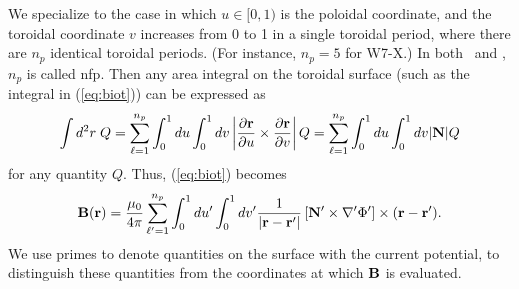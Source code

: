 We specialize to the case in which $u \in [0,1)$ is the poloidal coordinate, and the toroidal coordinate
$v$ increases from 0 to 1 in a single toroidal period, where there are $n_p$ identical toroidal periods.
(For instance, $n_p=5$ for W7-X.) In both \vmec~and \bdistrib, $n_p$ is called {\ttfamily nfp}.
Then any area integral on the toroidal surface (such as the integral in (\ref{eq:biot})) can be expressed as
\begin{equation}
\int d^2r\;Q = \sum_{\ell=1}^{n_p} \int_0^1 du \int_0^1 dv 
\left| \frac{\partial {\mathbf r}}{\partial u}\times\frac{\partial{\mathbf r}}{\partial v}\right|Q
=\sum_{\ell=1}^{n_p} \int_0^1 du \int_0^1 dv |{\mathbf N}|Q
\end{equation}
for any quantity $Q$.
Thus, (\ref{eq:biot})
becomes
\begin{equation}
{\mathbf B}({\mathbf r})
=\frac{\mu_0}{4\pi}
\sum_{\ell'=1}^{n_p} \int_0^1 du' \int_0^1 dv' \frac{1}{|{\mathbf r}-{\mathbf r}'|}
\left[ {\mathbf N}'\times\nabla' \Phi'\right]\times({\mathbf r}-{\mathbf r}').
\end{equation}
We use primes to denote quantities on the surface with the current potential,
to distinguish these quantities from the coordinates at which ${\mathbf B}$ is evaluated.

